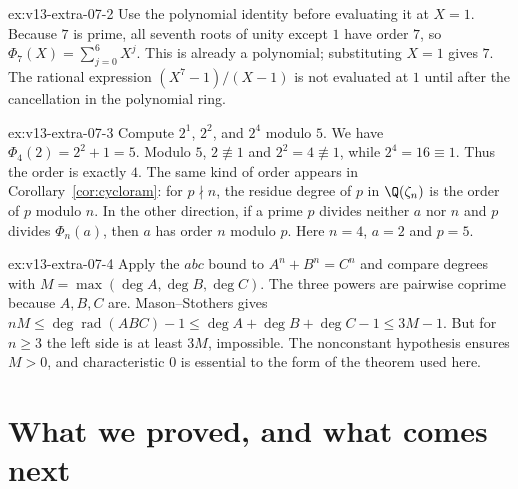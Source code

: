 \begin{solution}{ex:v13-extra-07-2}
\idea Use the polynomial identity before evaluating it at $X=1$.
\writeup Because $7$ is prime, all seventh roots of unity except $1$ have order $7$, so $\Phi_7(X)=\sum_{j=0}^6X^j$. This is already a polynomial; substituting $X=1$ gives $7$. The rational expression $(X^7-1)/(X-1)$ is not evaluated at $1$ until after the cancellation in the polynomial ring.
\end{solution}

\begin{solution}{ex:v13-extra-07-3}
\idea Compute $2^1$, $2^2$, and $2^4$ modulo $5$.
\writeup We have $\Phi_4(2)=2^2+1=5$. Modulo $5$, $2\not\equiv1$ and $2^2=4\not\equiv1$, while $2^4=16\equiv1$. Thus the order is exactly $4$. The same kind of order appears in Corollary~\ref{cor:cycloram}: for $p\nmid n$, the residue degree of $p$ in $\Q(\zeta_n)$ is the order of $p$ modulo $n$. In the other direction, if a prime $p$ divides neither $a$ nor $n$ and $p$ divides $\Phi_n(a)$, then $a$ has order $n$ modulo $p$. Here $n=4$, $a=2$ and $p=5$.
\end{solution}

\begin{solution}{ex:v13-extra-07-4}
\idea Apply the $abc$ bound to $A^n+B^n=C^n$ and compare degrees with $M=\max(\deg A,\deg B,\deg C)$.
\writeup The three powers are pairwise coprime because $A,B,C$ are. Mason--Stothers gives $nM\le\deg\operatorname{rad}(ABC)-1\le\deg A+\deg B+\deg C-1\le3M-1$. But for $n\ge3$ the left side is at least $3M$, impossible. The nonconstant hypothesis ensures $M>0$, and characteristic $0$ is essential to the form of the theorem used here.
\end{solution}

\section{What we proved, and what comes next}

